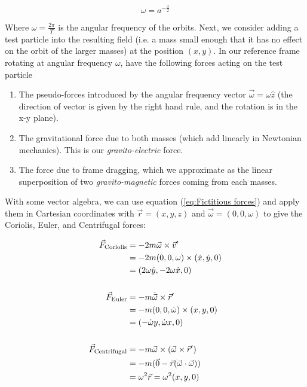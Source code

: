 \documentclass{article}
\begin{document}
\begin{equation}
    \label{eq:kepler's law}
    \omega = a^{-\frac{3}{2}}
\end{equation}

Where $\omega=\frac{2 \pi}{T}$ is the angular frequency of the orbits. Next, we consider adding a test particle into the resulting field (i.e. a mass small enough that it has no effect on the orbit of the larger masses) at the position $(x,y)$. In our reference frame rotating at angular frequency $\omega$, have the following forces acting on the test particle

\begin{enumerate}
    \item The pseudo-forces introduced by the angular frequency vector $\vec{\omega}=\omega \hat{z}$ (the direction of vector is given by the right hand rule, and the rotation is in the x-y plane).
    \item The gravitational force due to both masses (which add linearly in Newtonian mechanics). This is our \textit{gravito-electric} force.
    \item The force due to frame dragging, which we approximate as the linear superposition of two \textit{gravito-magnetic} forces coming from each masses.
\end{enumerate}

With some vector algebra, we can use equation (\ref{eq:Fictitious forces}) and apply them in Cartesian coordinates with $\vec{r}=(x,y,z)$ and $\vec{\omega}=(0, 0, \omega)$ to give the Coriolis, Euler, and Centrifugal forces:


\begin{align}
    \vec{F}_{\text{Coriolis}} &= -2 m \vec{\omega} \times \vec{v}^{\prime} \notag \\
    &= -2 m (0, 0, \omega) \times (\dot{x}, \dot{y}, 0) \notag \\
    &= (2 \omega \dot{y}, -2 \omega \dot{x}, 0) \notag \\
    \notag\\
    \vec{F}_{\text{Euler}} &= -m \dot{\vec{\omega}} \times \vec{r}^{\prime} \notag \\
    &= -m (0, 0, \dot{\omega}) \times (x, y, 0) \notag \\
    &= (-\dot{\omega} y, \dot{\omega} x, 0) \notag \\
    \notag\\
    \vec{F}_{\text{Centrifugal}} &= -m \vec{\omega} \times (\vec{\omega} \times \vec{r}^{\prime}) \notag \\
    &= -m (\vec{0} - \vec{r} (\vec{\omega} \cdot \vec{\omega})) \notag \\
    &= \omega^2 \vec{r} = \omega^2 (x, y, 0) \notag
\end{align}
\end{document}

